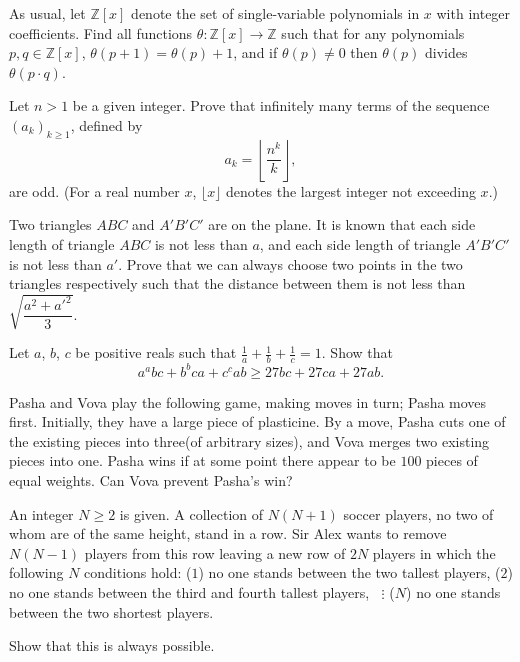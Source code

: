 \documentclass[11pt]{scrartcl}
\begin{document}
\begin{problem}[620629352845047]
As usual, let ${\mathbb Z}[x]$ denote the set of single-variable polynomials in $x$ with integer coefficients. Find all functions $\theta : {\mathbb Z}[x] \to {\mathbb Z}$ such that for any polynomials $p,q \in {\mathbb Z}[x]$,
$\theta(p+1) = \theta(p)+1$, and
if $\theta(p) \neq 0$ then $\theta(p)$ divides $\theta(p \cdot q)$.
\end{problem}
\begin{problem}[7021355208717803796]
Let $n > 1$ be a given integer. Prove that infinitely many terms of the sequence $(a_k )_{k\ge 1}$, defined by\[a_k=\left\lfloor\frac{n^k}{k}\right\rfloor,\]are odd. (For a real number $x$, $\lfloor x\rfloor$ denotes the largest integer not exceeding $x$.)
\end{problem}
\begin{problem}[3838489129977355762]
Two triangles $ABC$ and $A'B'C'$ are on the plane. It is known that each side length of triangle $ABC$ is not less than $a$, and each side length of triangle $A'B'C'$ is not less than $a'$. Prove that we can always choose two points in the two triangles respectively such that the distance between them is not less than $\sqrt{\dfrac{a^2+a'^2}{3}}$.
\end{problem}
\begin{problem}[395315144480173]
Let $a$, $b$, $c$ be positive reals such that $\frac{1}{a}+\frac{1}{b}+\frac{1}{c}=1$. Show that$$a^abc+b^bca+c^cab\ge 27bc+27ca+27ab.$$
\end{problem}
\begin{problem}[829271701496996]
Pasha and Vova play the following game, making moves in turn; Pasha moves first. Initially, they have a large piece of plasticine. By a move, Pasha cuts one of the existing pieces into three(of arbitrary sizes), and Vova merges two existing pieces into one. Pasha wins if at some point there appear to be $100$ pieces of equal weights. Can Vova prevent Pasha's win?
\end{problem}
\begin{problem}[874415503743541]
	An integer $N \ge 2$ is given. A collection of $N(N + 1)$ soccer players, no two of whom are of the same height, stand in a row. Sir Alex wants to remove $N(N - 1)$ players from this row leaving a new row of $2N$ players in which the following $N$ conditions hold:
($1$) no one stands between the two tallest players,
($2$) no one stands between the third and fourth tallest players,
$\;\;\vdots$
($N$) no one stands between the two shortest players.

Show that this is always possible.
\end{problem}
\end{document}
